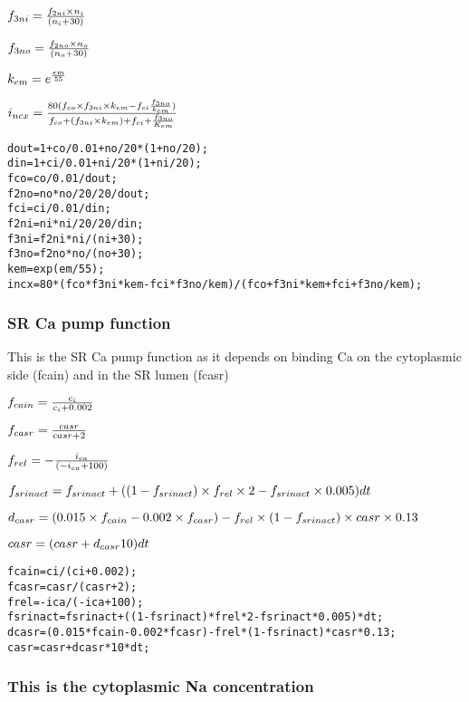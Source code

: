 \documentclass[11pt]{article}
\begin{document}
\(\large f_{3ni} = \frac{f_{2ni} \times n_i}{(n_i+30)}\)

\(\large f_{3no} = \frac{f_{2no} \times n_o}{(n_o+30)}\)

\(\large k_{em} = e^\frac{em}{55}\)

\(\large i_{ncx} = \frac{80(f_{co} \times f_{3ni} \times k_{em} - f_{ci}\frac{f_{3no}}{k_{em}})}{f_{co}+(f_{3ni} \times k_{em})+f_{ci}+\frac{f_{3no}}{K_{em}}}\)

    \begin{verbatim}
dout=1+co/0.01+no/20*(1+no/20);
din=1+ci/0.01+ni/20*(1+ni/20);
fco=co/0.01/dout;
f2no=no*no/20/20/dout;
fci=ci/0.01/din;
f2ni=ni*ni/20/20/din;
f3ni=f2ni*ni/(ni+30);
f3no=f2no*no/(no+30);
kem=exp(em/55);
incx=80*(fco*f3ni*kem-fci*f3no/kem)/(fco+f3ni*kem+fci+f3no/kem);
\end{verbatim}

    \subsubsection{SR Ca pump function}\label{sr-ca-pump-function}

This is the SR Ca pump function as it depends on binding Ca on the
cytoplasmic side (fcain) and in the SR lumen (fcasr)

    \(\large f_{cain} = \frac{c_i}{c_i+0.002}\)

\(\large f_{casr} = \frac{casr}{casr+2}\)

\(\large f_{rel} = -\frac{i_{ca}}{(-i_{ca}+100)}\)

\(\large f_{srinact} = f_{srinact}+((1-f_{srinact}) \times f_{rel} \times 2-f_{srinact} \times 0.005)dt\)

\(\large d_{casr} = (0.015 \times f_{cain}-0.002 \times f_{casr})-f_{rel}\times (1-f_{srinact}) \times casr \times 0.13\)

\(\large {casr} = (casr +d_{casr}10)dt\)

    \begin{verbatim}
fcain=ci/(ci+0.002);
fcasr=casr/(casr+2);
frel=-ica/(-ica+100);
fsrinact=fsrinact+((1-fsrinact)*frel*2-fsrinact*0.005)*dt; 
dcasr=(0.015*fcain-0.002*fcasr)-frel*(1-fsrinact)*casr*0.13;
casr=casr+dcasr*10*dt;
\end{verbatim}

    \subsubsection{This is the cytoplasmic Na
concentration}\label{this-is-the-cytoplasmic-na-concentration}
\end{document}
